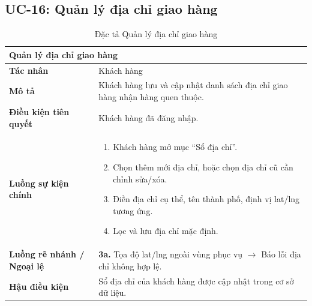 \subsection{UC-16: Quản lý địa chỉ giao hàng}
\begin{table}[H]
  \centering
  \begin{tabularx}{\textwidth}{|l|X|}
    \hline
    \multicolumn{2}{|l|}{\textbf{Quản lý địa chỉ giao hàng}} \\
    \hline
    \textbf{Tác nhân}           & Khách hàng \\ \hline
    \textbf{Mô tả}              & Khách hàng lưu và cập nhật danh sách địa chỉ giao hàng nhận hàng quen thuộc. \\ \hline
    \textbf{Điều kiện tiên quyết} & Khách hàng đã đăng nhập. \\ \hline
    \textbf{Luồng sự kiện chính} &
      \begin{enumerate}[leftmargin=*, nosep, topsep=0pt]
        \item Khách hàng mở mục ``Sổ địa chỉ''.
        \item Chọn thêm mới địa chỉ, hoặc chọn địa chỉ cũ cần chỉnh sửa/xóa.
        \item Điền địa chỉ cụ thể, tên thành phố, định vị lat/lng tương ứng.
        \item Lọc và lưu địa chỉ mặc định.
      \end{enumerate} \\ \hline
    \textbf{Luồng rẽ nhánh / Ngoại lệ} &
      \textbf{3a.} Tọa độ lat/lng ngoài vùng phục vụ $\rightarrow$ Báo lỗi địa chỉ không hợp lệ. \\ \hline
    \textbf{Hậu điều kiện}      & Sổ địa chỉ của khách hàng được cập nhật trong cơ sở dữ liệu. \\
    \hline
  \end{tabularx}
  \caption{Đặc tả Quản lý địa chỉ giao hàng}
  \label{tab:uc16}
\end{table}

